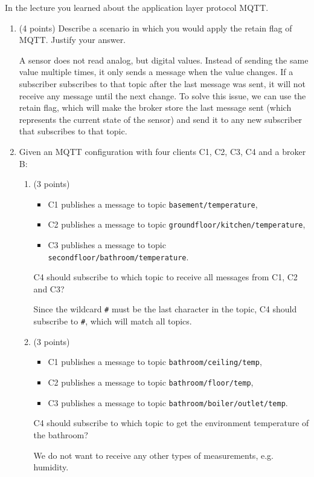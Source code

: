 \documentclass[12pt]{article}
\begin{document}
    \begin{ejercicio}[20 points]
        In the lecture you learned about the application layer protocol MQTT.
        \begin{enumerate}[label=\alph*)]
            \item (4 points) Describe a scenario in which you would apply the retain flag of MQTT. Justify your answer.
            
            A sensor does not read analog, but digital values. Instead of sending the same value multiple times, it only sends a message when the value changes. If a subscriber subscribes to that topic after the last message was sent, it will not receive any message until the next change. To solve this issue, we can use the retain flag, which will make the broker store the last message sent (which represents the current state of the sensor) and send it to any new subscriber that subscribes to that topic.
            \item Given an MQTT configuration with four clients C1, C2, C3, C4 and a broker B:
            \begin{enumerate}[label=\roman*)]
                \item (3 points)
                \begin{itemize}
                    \item C1 publishes a message to topic \verb|basement/temperature|,
                    \item C2 publishes a message to topic \verb|groundfloor/kitchen/temperature|,
                    \item C3 publishes a message to topic \verb|secondfloor/bathroom/temperature|.
                \end{itemize}
                C4 should subscribe to which topic to receive all messages from C1, C2 and C3?


                Since the wildcard \verb|#| must be the last character in the topic, C4 should subscribe to \verb|#|, which will match all topics.
                \item (3 points)
                \begin{itemize}
                    \item C1 publishes a message to topic \verb|bathroom/ceiling/temp|,
                    \item C2 publishes a message to topic \verb|bathroom/floor/temp|,
                    \item C3 publishes a message to topic \verb|bathroom/boiler/outlet/temp|.
                \end{itemize}
                C4 should subscribe to which topic to get the environment temperature of the bathroom?
                \begin{observacion}
                    We do not want to receive any other types of measurements, e.g. humidity.
                \end{observacion}
                

\end{enumerate}
\end{enumerate}
\end{ejercicio}
\end{document}
